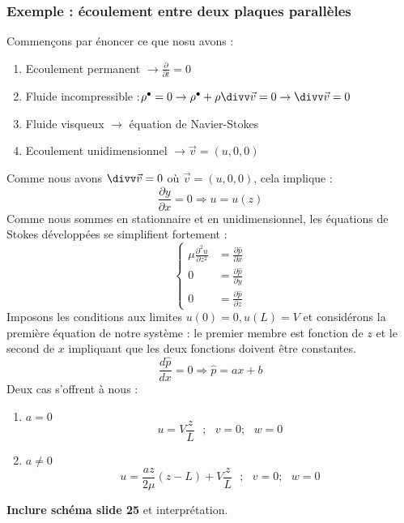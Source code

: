 		\subsubsection{Exemple : écoulement entre deux plaques parallèles}
		Commençons par énoncer ce que nosu avons : 
		\begin{enumerate}
		\item Ecoulement permanent $\rightarrow \frac{\partial}{\partial t}=0$
		\item Fluide incompressible :$\rho^\bullet=0 \rightarrow \rho^\bullet + \rho
		\divv\vec{v}=0 \rightarrow \divv \vec{v}=0$
		\item Fluide visqueux $\rightarrow$ équation de Navier-Stokes
		\item Ecoulement unidimensionnel $\rightarrow \vec{v} = (u,0,0)$
		\end{enumerate}				
		Comme nous avons $\divv \vec v=0$ où $\vec{v}=(u,0,0)$, cela implique :
		\begin{equation}
		\frac{\partial y}{\partial x} = 0 \Rightarrow u = u(z)
		\end{equation}
		Comme nous sommes en stationnaire et en unidimensionnel, les équations 
		de Stokes développées se simplifient fortement :
		\begin{equation}
		\left\{\begin{array}{ll}
		\mu \frac{\partial^2u}{\partial z^2} &= \frac{\partial \hat{p}}{\partial x}\\
		0 &= \frac{\partial \hat{p}}{\partial y}\\
		0 &= \frac{\partial \hat{p}}{\partial z}
		\end{array}\right.
		\end{equation}
		Imposons les conditions aux limites $u(0)=0, u(L)=V$ et considérons la première 
		équation de notre système : le premier membre est fonction de $z$ et le second de
		$x$ impliquant que les deux fonctions doivent être constantes.
		\begin{equation}
		\frac{d\hat{p}}{dx}= 0 \Rightarrow \hat{p}=ax+b
		\end{equation}
		Deux cas s'offrent à nous : 
		\begin{enumerate}
		\item $a=0$\\
		\begin{equation}
		u = V\frac{z}{L}\ \ \ ;\ \ \ v=0;\ \ \ w=0
		\end{equation}
		\item $a\neq0$\\
		\begin{equation}
		u = \frac{az}{2\mu}(z-L) + V\frac{z}{L}\ \ \ ;\ \ \ v=0;\ \ \ w=0
		\end{equation}
		\end{enumerate}
		\textbf{Inclure schéma slide 25} et interprétation.
		
